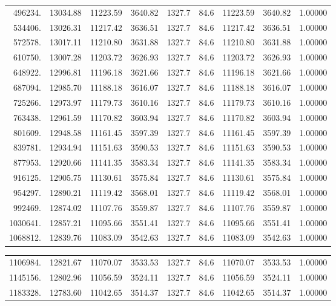 {\begin{tabular}{rrrrrrrrr}
  496234.& 13034.88& 11223.59 & 3640.82  & 1327.7    & 84.6& 11223.59 & 3640.82 & 1.00000 \\
  534406.& 13026.31& 11217.42 & 3636.51  & 1327.7    & 84.6& 11217.42 & 3636.51 & 1.00000 \\
  572578.& 13017.11& 11210.80 & 3631.88  & 1327.7    & 84.6& 11210.80 & 3631.88 & 1.00000 \\
  610750.& 13007.28& 11203.72 & 3626.93  & 1327.7    & 84.6& 11203.72 & 3626.93 & 1.00000 \\
  648922.& 12996.81& 11196.18 & 3621.66  & 1327.7    & 84.6& 11196.18 & 3621.66 & 1.00000 \\
  687094.& 12985.70& 11188.18 & 3616.07  & 1327.7    & 84.6& 11188.18 & 3616.07 & 1.00000 \\
  725266.& 12973.97& 11179.73 & 3610.16  & 1327.7    & 84.6& 11179.73 & 3610.16 & 1.00000 \\
  763438.& 12961.59& 11170.82 & 3603.94  & 1327.7    & 84.6& 11170.82 & 3603.94 & 1.00000 \\
  801609.& 12948.58& 11161.45 & 3597.39  & 1327.7    & 84.6& 11161.45 & 3597.39 & 1.00000 \\
  839781.& 12934.94& 11151.63 & 3590.53  & 1327.7    & 84.6& 11151.63 & 3590.53 & 1.00000 \\
  877953.& 12920.66& 11141.35 & 3583.34  & 1327.7    & 84.6& 11141.35 & 3583.34 & 1.00000 \\
  916125.& 12905.75& 11130.61 & 3575.84  & 1327.7    & 84.6& 11130.61 & 3575.84 & 1.00000 \\
  954297.& 12890.21& 11119.42 & 3568.01  & 1327.7    & 84.6& 11119.42 & 3568.01 & 1.00000 \\
  992469.& 12874.02& 11107.76 & 3559.87  & 1327.7    & 84.6& 11107.76 & 3559.87 & 1.00000 \\
1030641.& 12857.21& 11095.66 & 3551.41  & 1327.7    & 84.6& 11095.66 & 3551.41 & 1.00000 \\
1068812.& 12839.76& 11083.09 & 3542.63  & 1327.7    & 84.6& 11083.09 & 3542.63 & 1.00000 \\
\end{tabular}
\newpage
\begin{tabular}{rrrrrrrrr} \\
1106984.& 12821.67& 11070.07 & 3533.53  & 1327.7    & 84.6& 11070.07 & 3533.53 & 1.00000 \\
1145156.& 12802.96& 11056.59 & 3524.11  & 1327.7    & 84.6& 11056.59 & 3524.11 & 1.00000 \\
1183328.& 12783.60& 11042.65 & 3514.37  & 1327.7    & 84.6& 11042.65 & 3514.37 & 1.00000 \\

\end{tabular}}
